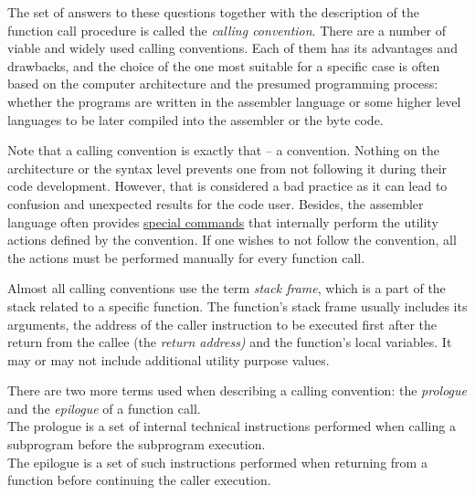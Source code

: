 The set of answers to these questions together with the description
of the function call procedure is called the \textit{calling convention}.
There are a number of viable and widely used calling conventions.
Each of them has its advantages and drawbacks, and the choice of the one most
suitable for a specific case is often based on the computer architecture
and the presumed programming process: whether the programs are written
in the assembler language or some higher level languages to be later
compiled into the assembler or the byte code.

Note that a calling convention is exactly that -- a convention.
Nothing on the architecture or the syntax level prevents one from not following
it during their code development.
However, that is considered a bad practice as it can lead to confusion and
unexpected results for the code user.
Besides, the assembler language often provides
\hyperlink{functions:commands}{special commands} that internally
perform the utility actions defined by the convention.
If one wishes to not follow the convention, all the actions must be performed
manually for every function call.

Almost all calling conventions use the term \textit{stack frame}, which
is a part of the stack related to a specific function.
The function's stack frame usually includes its arguments, the address
of the caller instruction to be executed first after the return from
the callee (the \textit{return address)} and the function's local variables.
It may or may not include additional utility purpose values.

There are two more terms used when describing a calling convention:
the \textit{prologue} and the \textit{epilogue} of a function call. \\
The prologue is a set of internal technical instructions performed
when calling a subprogram before the subprogram execution. \\
The epilogue is a set of such instructions performed
when returning from a function before continuing the caller execution.
